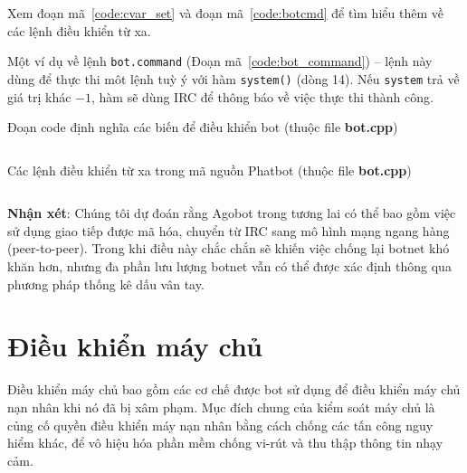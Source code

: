 Xem đoạn mã~\ref{code:cvar_set} và đoạn mã~\ref{code:botcmd} để tìm hiểu thêm về các lệnh điều khiển từ xa.

Một ví dụ về lệnh \texttt{bot.command} (Đoạn mã~\ref{code:bot_command}) --
lệnh này dùng để thực thi môt lệnh tuỳ ý với hàm \texttt{system()} (dòng 14).
Nếu \texttt{system} trả về giá trị khác $-1$,
hàm sẽ dùng IRC để thông báo về việc thực thi thành công.

\begin{listing}[ht]
\caption{Đoạn code định nghĩa các biến để điều khiển bot (thuộc file \textbf{bot.cpp})}\label{code:cvar_set}
\inputminted{cpp}{./listings/var_bot.cpp}
\end{listing}

\begin{listing}[ht]
\caption{Các lệnh điều khiển từ xa trong mã nguồn Phatbot (thuộc file \textbf{bot.cpp})}\label{code:botcmd}
\inputminted{cpp}{./listings/botcmd_bot.cpp}
\end{listing}


\textbf{Nhận xét}:
Chúng tôi dự đoán rằng Agobot trong tương lai có thể bao gồm việc sử dụng giao tiếp được mã hóa,
chuyển từ IRC sang mô hình mạng ngang hàng (peer-to-peer).
Trong khi điều này chắc chắn sẽ khiến việc chống lại botnet khó khăn hơn,
nhưng đa phần lưu lượng botnet vẫn có thể được xác định thông qua phương pháp thống kê dấu vân tay.

\section{Điều khiển máy chủ}

Điều khiển máy chủ bao gồm các cơ chế được bot sử dụng để điều khiển máy chủ nạn nhân khi nó đã bị xâm phạm. Mục đích chung của kiểm soát máy chủ là củng cố quyền điều khiển máy nạn nhân bằng
cách chống các tấn công nguy hiểm khác,
để vô hiệu hóa phần mềm chống vi-rút và thu thập thông tin nhạy cảm.

